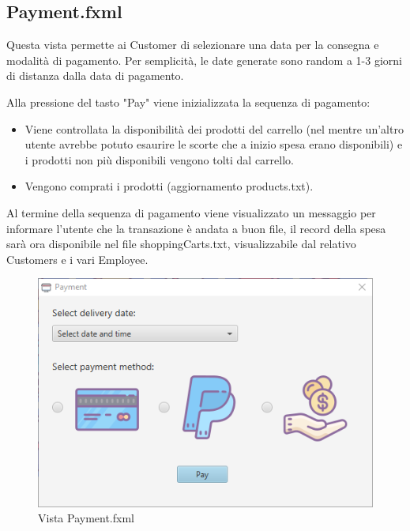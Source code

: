 \documentclass[12pt]{article}
\begin{document}
\clearpage

\subsection{Payment.fxml}
Questa vista permette ai Customer di selezionare una data per la consegna e modalità di pagamento. Per semplicità, le date generate sono random a 1-3 giorni di distanza dalla data di pagamento.

Alla pressione del tasto "Pay" viene inizializzata la sequenza di pagamento:
\begin{itemize}
\item Viene controllata la disponibilità dei prodotti del carrello (nel mentre un'altro utente avrebbe potuto esaurire le scorte che a inizio spesa erano disponibili) e i prodotti non più disponibili vengono tolti dal carrello.
\item Vengono comprati i prodotti (aggiornamento products.txt).
\end{itemize}
Al termine della sequenza di pagamento viene visualizzato un messaggio per informare l'utente che la transazione è andata a buon file, il record della spesa sarà ora disponibile nel file shoppingCarts.txt, visualizzabile dal relativo Customers e i vari Employee.

\begin{figure}[h!]
	\begin{center}
 	 	\includegraphics[width=\textwidth,height=\textheight,keepaspectratio]{media/views/payment.png}
  	 	 \caption{Vista Payment.fxml}
	\end{center}
\end{figure}

\clearpage
\end{document}
